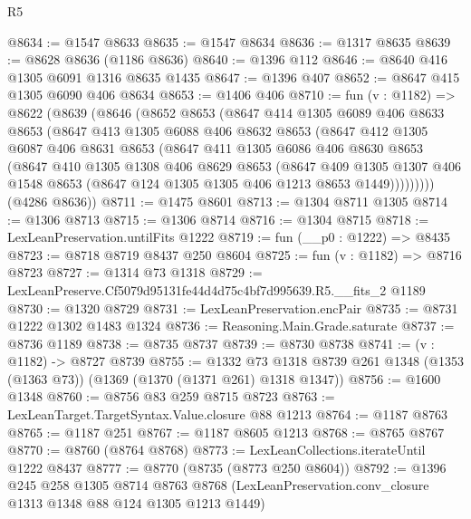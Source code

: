 \begin{lexlean}{R5}
\begin{coremodule}
@8634 := @1547 @8633
@8635 := @1547 @8634
@8636 := @1317 @8635
@8639 := @8628 @8636 (@1186 @8636)
@8640 := @1396 @112
@8646 := @8640 @416 @1305 @6091 @1316 @8635 @1435
@8647 := @1396 @407
@8652 := @8647 @415 @1305 @6090 @406 @8634
@8653 := @1406 @406
@8710 := fun (v : @1182) =>
  @8622
    (@8639
      (@8646
        (@8652
          @8653
          (@8647
            @414
            @1305
            @6089
            @406
            @8633
            @8653
            (@8647
              @413
              @1305
              @6088
              @406
              @8632
              @8653
              (@8647
                @412
                @1305
                @6087
                @406
                @8631
                @8653
                (@8647
                  @411
                  @1305
                  @6086
                  @406
                  @8630
                  @8653
                  (@8647
                    @410
                    @1305
                    @1308
                    @406
                    @8629
                    @8653
                    (@8647
                      @409
                      @1305
                      @1307
                      @406
                      @1548
                      @8653
                      (@8647 @124 @1305 @1305 @406 @1213 @8653 @1449)))))))))
      (@4286 @8636))
@8711 := @1475 @8601
@8713 := @1304 @8711 @1305
@8714 := @1306 @8713
@8715 := @1306 @8714
@8716 := @1304 @8715
@8718 := LexLeanPreservation.untilFits @1222
@8719 := fun (__p0 : @1222) => @8435
@8723 := @8718 @8719 @8437 @250 @8604
@8725 := fun (v : @1182) => @8716 @8723
@8727 := @1314 @73 @1318
@8729 := LexLeanPreserve.Cf5079d95131fe44d4d75c4bf7d995639.R5.__fits_2 @1189
@8730 := @1320 @8729
@8731 := LexLeanPreservation.encPair
@8735 := @8731 @1222 @1302 @1483 @1324
@8736 := Reasoning.Main.Grade.saturate
@8737 := @8736 @1189
@8738 := @8735 @8737
@8739 := @8730 @8738
@8741 := (v : @1182) -> @8727 @8739
@8755 := @1332
    @73
    @1318
    @8739
    @261
    @1348
    (@1353 (@1363 @73))
    (@1369 (@1370 (@1371 @261) @1318 @1347))
@8756 := @1600 @1348
@8760 := @8756 @83 @259 @8715 @8723
@8763 := LexLeanTarget.TargetSyntax.Value.closure @88 @1213
@8764 := @1187 @8763
@8765 := @1187 @251
@8767 := @1187 @8605 @1213
@8768 := @8765 @8767
@8770 := @8760 (@8764 @8768)
@8773 := LexLeanCollections.iterateUntil @1222 @8437
@8777 := @8770 (@8735 (@8773 @250 @8604))
@8792 := @1396
    @245
    @258
    @1305
    @8714
    @8763
    @8768
    (LexLeanPreservation.conv_closure @1313 @1348 @88 @124 @1305 @1213 @1449)

\end{coremodule}
\end{lexlean}
